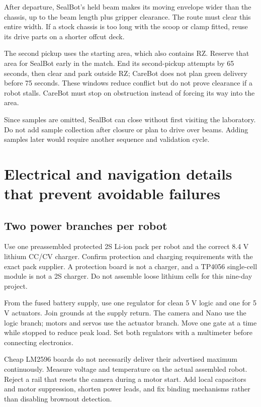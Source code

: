 \documentclass[10pt,a4paper]{article}
\begin{document}
After departure, SealBot's held beam makes its moving envelope wider than the chassis, up to the beam length plus gripper clearance. The route must clear this entire width. If a stock chassis is too long with the scoop or clamp fitted, reuse its drive parts on a shorter offcut deck.

The second pickup uses the starting area, which also contains RZ. Reserve that area for SealBot early in the match. End its second-pickup attempts by 65 seconds, then clear and park outside RZ; CareBot does not plan green delivery before 75 seconds. These windows reduce conflict but do not prove clearance if a robot stalls. CareBot must stop on obstruction instead of forcing its way into the area.

Since samples are omitted, SealBot can close without first visiting the laboratory. Do not add sample collection after closure or plan to drive over beams. Adding samples later would require another sequence and validation cycle.

\section{Electrical and navigation details that prevent avoidable failures}
\subsection{Two power branches per robot}
Use one preassembled protected 2S Li-ion pack per robot and the correct 8.4 V lithium CC/CV charger. Confirm protection and charging requirements with the exact pack supplier. A protection board is not a charger, and a TP4056 single-cell module is not a 2S charger. Do not assemble loose lithium cells for this nine-day project.

From the fused battery supply, use one regulator for clean 5 V logic and one for 5 V actuators. Join grounds at the supply return. The camera and Nano use the logic branch; motors and servos use the actuator branch. Move one gate at a time while stopped to reduce peak load. Set both regulators with a multimeter before connecting electronics.

Cheap LM2596 boards do not necessarily deliver their advertised maximum continuously. Measure voltage and temperature on the actual assembled robot. Reject a rail that resets the camera during a motor start. Add local capacitors and motor suppression, shorten power leads, and fix binding mechanisms rather than disabling brownout detection.
\end{document}
